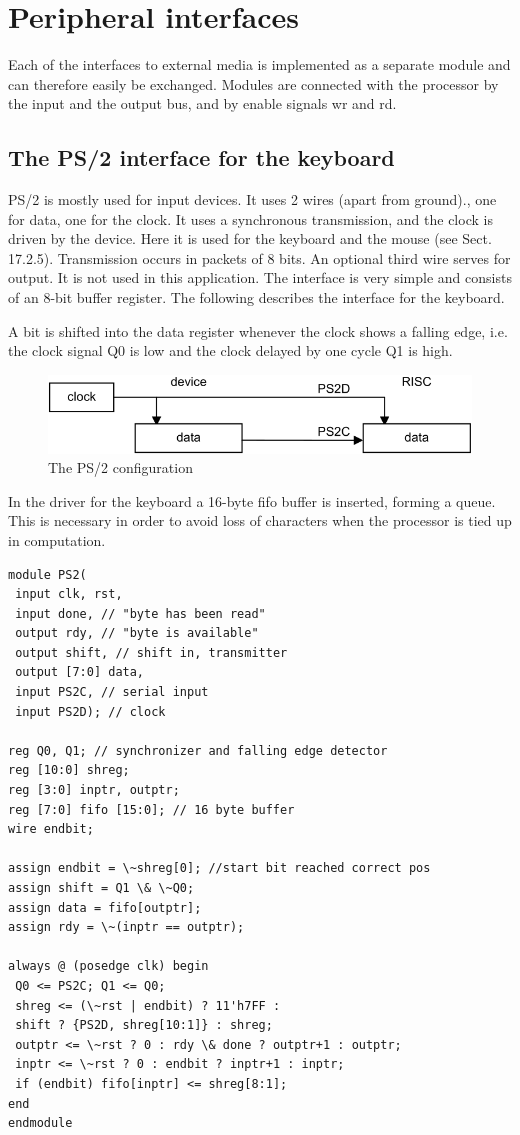 \section{Peripheral interfaces}
Each of the interfaces to external media is implemented as a separate module and can therefore
easily be exchanged. Modules are connected with the processor by the input and the output bus,
and by enable signals wr and rd.

\subsection{The PS/2 interface for the keyboard}
PS/2 is mostly used for input devices. It uses 2 wires (apart from ground)., one for data, one for the
clock. It uses a synchronous transmission, and the clock is driven by the device. Here it is used for
the keyboard and the mouse (see Sect. 17.2.5). Transmission occurs in packets of 8 bits. An
optional third wire serves for output. It is not used in this application. The interface is very simple
and consists of an 8-bit buffer register. The following describes the interface for the keyboard.

A bit is shifted into the data register whenever the clock shows a falling edge, i.e. the clock signal
Q0 is low and the clock delayed by one cycle Q1 is high.
\begin{figure}[h!]
  \centering
  \includegraphics[width=.9\textwidth]{i/G/3.png}
  \caption{The PS/2 configuration}
  \label{fig:ps2}
\end{figure}

In the driver for the keyboard a 16-byte fifo buffer is inserted, forming a queue. This is necessary in order to
avoid loss of characters when the processor is tied up in computation.
\begin{verbatim}
module PS2(
 input clk, rst,
 input done, // "byte has been read"
 output rdy, // "byte is available"
 output shift, // shift in, transmitter
 output [7:0] data,
 input PS2C, // serial input
 input PS2D); // clock

reg Q0, Q1; // synchronizer and falling edge detector
reg [10:0] shreg;
reg [3:0] inptr, outptr;
reg [7:0] fifo [15:0]; // 16 byte buffer
wire endbit;

assign endbit = \~shreg[0]; //start bit reached correct pos
assign shift = Q1 \& \~Q0;
assign data = fifo[outptr];
assign rdy = \~(inptr == outptr);

always @ (posedge clk) begin
 Q0 <= PS2C; Q1 <= Q0;
 shreg <= (\~rst | endbit) ? 11'h7FF :
 shift ? {PS2D, shreg[10:1]} : shreg;
 outptr <= \~rst ? 0 : rdy \& done ? outptr+1 : outptr;
 inptr <= \~rst ? 0 : endbit ? inptr+1 : inptr;
 if (endbit) fifo[inptr] <= shreg[8:1];
end
endmodule
\end{verbatim}

